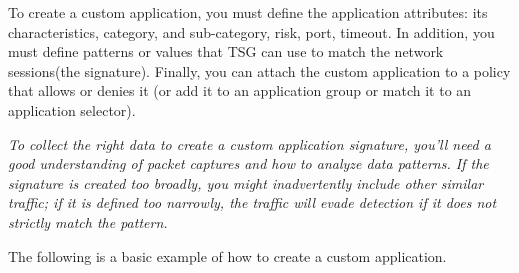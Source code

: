 To create a custom application, you must define the application attributes: its characteristics, category, and sub-category, risk, port, timeout. 
In addition, you must define patterns or values that TSG can use to match the network sessions(the signature). 
Finally, you can attach the custom application to a policy that allows or denies it (or add it to an application group or match it to an application selector).


\notemark\textit{To collect the right data to create a custom application signature, you'll need a good understanding of packet captures and how to analyze data patterns. 
If the signature is created too broadly, you might inadvertently include other similar traffic; if it is defined too narrowly, the traffic will evade detection 
if it does not strictly match the pattern.}


The following is a basic example of how to create a custom application.

